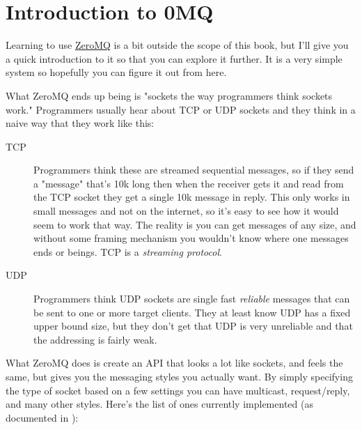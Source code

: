 \section{Introduction to 0MQ}


Learning to use \href{http://zeromq.org}{ZeroMQ} is a bit outside the scope of this book, but I'll give you
a quick introduction to it so that you can explore it further.  It is a very simple
system so hopefully you can figure it out from here.

What ZeroMQ ends up being is "sockets the way programmers think sockets work."  Programmers
usually hear about TCP or UDP sockets and they think in a naive way that they work like
this:

\begin{description}
\item [TCP] Programmers think these are streamed sequential messages, so if
   they send a "message" that's 10k long then when the receiver gets it and read
   from the TCP socket they get a single 10k message in reply.  This only works in
   small messages and not on the internet, so it's easy to see how it would seem
   to work that way.  The reality is you can get messages of any size, and without
   some framing mechanism you wouldn't know where one messages ends or beings.
   TCP is a \emph{streaming protocol}.

\item [UDP] Programmers think UDP sockets are single fast \emph{reliable} messages
    that can be sent to one or more target clients.  They at least know UDP has a fixed
    upper bound size, but they don't get that UDP is very unreliable and that the addressing
    is fairly weak.
\end{description}

What ZeroMQ does is create an API that looks a lot like sockets, and feels the same, but
gives you the messaging styles you actually want.  By simply specifying the type of socket
based on a few settings you can have multicast, request/reply, and many other styles.  Here's
the list of ones currently implemented (as documented in ):

